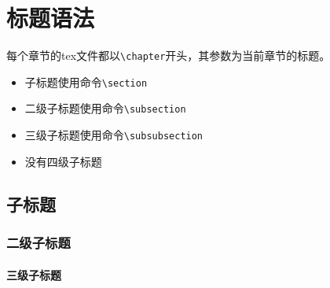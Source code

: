 \chapter{标题语法}

每个章节的tex文件都以\verb|\chapter|开头，其参数为当前章节的标题。

\begin{itemize}
    \item 子标题使用命令\verb|\section|
    \item 二级子标题使用命令\verb|\subsection|
    \item 三级子标题使用命令\verb|\subsubsection|
    \item 没有四级子标题
\end{itemize}

\section{子标题}

\subsection{二级子标题}

\subsubsection{三级子标题}
